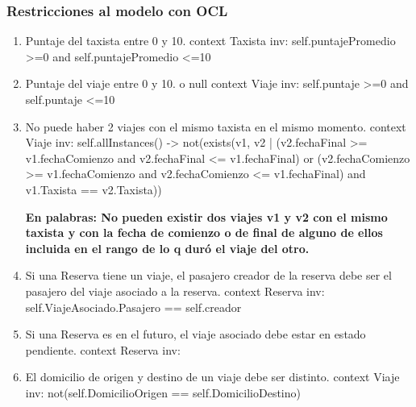 \subsubsection{Restricciones al modelo con OCL}
\begin{enumerate}
	\item \begin{ocl}{Puntaje del taxista entre 0 y 10.}
		  context Taxista
		  inv: self.puntajePromedio >=0 and
		       self.puntajePromedio <=10
		\end{ocl}
	
	\item \begin{ocl}{Puntaje del viaje entre 0 y 10. o null}
		  context Viaje
		  inv: self.puntaje >=0 and
		       self.puntaje <=10
		\end{ocl}

	\item \begin{ocl}{No puede haber 2 viajes con el mismo taxista en el mismo momento.}
		  context Viaje
		  inv: self.allInstances() -> not(exists(v1, v2 | 
		     (v2.fechaFinal >= v1.fechaComienzo and v2.fechaFinal <= v1.fechaFinal) or 
		     (v2.fechaComienzo >= v1.fechaComienzo and v2.fechaComienzo <= v1.fechaFinal)
		     and v1.Taxista == v2.Taxista))
		\end{ocl}
		\textbf{En palabras: No pueden existir dos viajes v1 y v2 con el mismo taxista y con la fecha de comienzo o de final de alguno de ellos incluida en el rango de lo q duró el viaje del otro.}

	\item \begin{ocl}{Si una Reserva tiene un viaje, el pasajero creador de la reserva debe ser el pasajero del viaje asociado a la reserva.}
		  context Reserva
		  inv: self.ViajeAsociado.Pasajero == self.creador
		\end{ocl}

	\item \begin{ocl}{Si una Reserva es en el futuro, el viaje asociado debe estar en estado pendiente.}
		  context Reserva
		  inv: 
		\end{ocl}

	\item \begin{ocl}{El domicilio de origen y destino de un viaje debe ser distinto.}
		  context Viaje
		  inv: not(self.DomicilioOrigen == self.DomicilioDestino)
		\end{ocl}


\end{enumerate}
